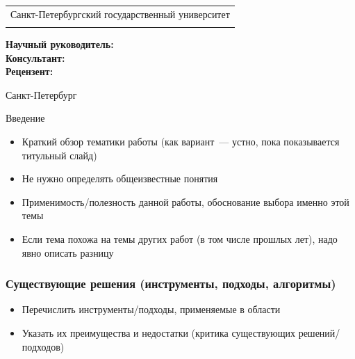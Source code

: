 \documentclass
  [ russian
  , aspectratio=1610 %
  ] {beamer}
\title[Короткое название]{\my@title@title@ru}
\author[\my@title@author@ru]{\my@title@author@ru, группа \academicGroup}
\institute[СПбГУ]{}
\date[9 сентября 2024 г.]{}
\makeatletter
\newcommand{\advisorChair}{\my@title@chair@ru}
\newcommand{\supervisor}{\my@title@supervisor@ru}
\newcommand{\supervisorPosition}{\my@title@supervisorPosition@ru}
\newcommand{\consultant}{\my@title@consultant@ru}
\newcommand{\consultantPosition}{\my@title@consultantPosition@ru}
\newcommand{\reviewer}{\my@title@reviewer@ru}
\newcommand{\reviewerPosition}{\my@title@reviewerPosition@ru}
\newcommand{\defenseYear}{\my@title@year@ru}
\makeatother
\begin{document}
{

\begin{frame}
    \vspace{15pt}
    \begin{center}
        \begin{tabular}{c}
            \scriptsize{Санкт-Петербургский государственный университет} \\
            \scriptsize{\advisorChair}
        \end{tabular}
        \titlepage
    \end{center}

    \btVFill

    {\scriptsize
        \textbf{Научный руководитель:}  \supervisorPosition~\supervisor \\
        \textbf{Консультант:}  \consultantPosition~\consultant \\
        \textbf{Рецензент:} \reviewerPosition~\reviewer \\
    }
    \makeatother
    \begin{center}
        \vspace{5pt}
        \scriptsize{Санкт-Петербург\\ \defenseYear}
    \end{center}
\end{frame}
}

\begin{frame}{Введение}
    \begin{itemize}
        \item Краткий обзор тематики работы (как вариант~--- устно, пока показывается титульный слайд)
        \item Не нужно определять общеизвестные понятия
        \item Применимость/полезность данной работы, обоснование выбора именно этой темы
        \item Если тема похожа на темы других работ (в том числе прошлых лет), надо явно описать разницу
    \end{itemize}
\end{frame}

\begin{frame}
    \frametitle{Существующие решения (инструменты, подходы, алгоритмы)}
    \begin{itemize}
        \item Перечислить инструменты/подходы, применяемые в области
        \item Указать их преимущества и недостатки (критика существующих решений/подходов)
    \end{itemize}

\end{frame}
\end{document}
